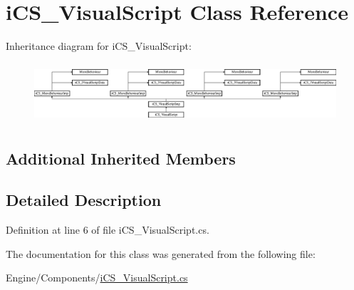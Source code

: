 \hypertarget{classi_c_s___visual_script}{\section{i\+C\+S\+\_\+\+Visual\+Script Class Reference}
\label{classi_c_s___visual_script}
}
Inheritance diagram for i\+C\+S\+\_\+\+Visual\+Script\+:\begin{figure}[H]
\begin{center}
\leavevmode
\includegraphics[height=2.243590cm]{classi_c_s___visual_script}
\end{center}
\end{figure}
\subsection*{Additional Inherited Members}


\subsection{Detailed Description}


Definition at line 6 of file i\+C\+S\+\_\+\+Visual\+Script.\+cs.



The documentation for this class was generated from the following file\+:\begin{DoxyCompactItemize}
\item 
Engine/\+Components/\hyperlink{i_c_s___visual_script_8cs}{i\+C\+S\+\_\+\+Visual\+Script.\+cs}\end{DoxyCompactItemize}
